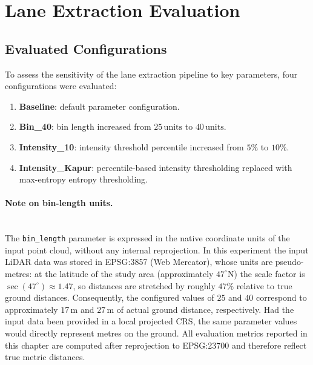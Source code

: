 \section{Lane Extraction Evaluation}
\label{sec:eval_lanes}

\subsection{Evaluated Configurations}
\label{sec:eval_lanes_configs}

To assess the sensitivity of the lane extraction pipeline to key parameters, four configurations were evaluated:

\begin{enumerate}
  \item \textbf{Baseline}: default parameter configuration.
  \item \textbf{Bin\_40}: bin length increased from $25\,\mathrm{units}$ to $40\,\mathrm{units}$.
  \item \textbf{Intensity\_10}: intensity threshold percentile increased from $5\%$ to $10\%$.
  \item \textbf{Intensity\_Kapur}: percentile-based intensity thresholding replaced with max-entropy entropy thresholding.
\end{enumerate}

\paragraph{Note on bin-length units.}\mbox{} \\
The \texttt{bin\_length} parameter is expressed in the native coordinate units of the input point cloud, without any internal reprojection.
In this experiment the input LiDAR data was stored in EPSG:3857 (Web Mercator), whose units are pseudo-metres: at the latitude of the study area (approximately $47^{\circ}$N) the scale factor is $\sec(47^{\circ}) \approx 1.47$, so distances are stretched by roughly $47\%$ relative to true ground distances.
Consequently, the configured values of $25$ and $40$ correspond to approximately $17\,\mathrm{m}$ and $27\,\mathrm{m}$ of actual ground distance, respectively.
Had the input data been provided in a local projected CRS, the same parameter values would directly represent metres on the ground.
All evaluation metrics reported in this chapter are computed after reprojection to EPSG:23700 and therefore reflect true metric distances.

